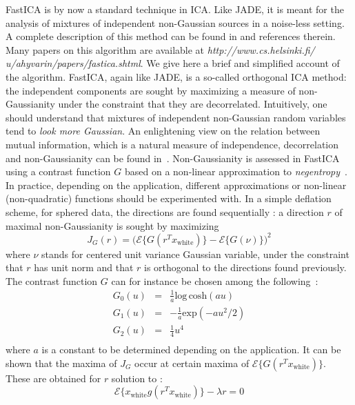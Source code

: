 FastICA is by now a standard technique in ICA. Like JADE, it is meant for the analysis of mixtures of independent non-Gaussian sources in 
a noise-less setting. A complete description of this method can be found in \cite{ica:icabook} and references therein. Many papers on this 
algorithm are available at \emph{http://www.cs.helsinki.fi/ u/ahyvarin/papers/fastica.shtml}. We give here a brief and simplified account 
of the algorithm. FastICA, again like JADE, is a so-called orthogonal ICA method: the independent components are sought by maximizing a 
measure of non-Gaussianity under the constraint that they are decorrelated. Intuitively, one should understand that mixtures of independent 
non-Gaussian random variables tend to \emph{ look more Gaussian}. An enlightening view on the relation between mutual information, which is 
a natural measure of independence, decorrelation and non-Gaussianity can be found in~\cite{ica:3easy,ica:geomindep}. Non-Gaussianity is assessed 
in FastICA using a contrast function $G$ based on a non-linear approximation to \emph{negentropy}~\cite{ica:icabook}. In practice, depending 
on the application, different approximations or non-linear (non-quadratic) functions should be experimented with. In a simple deflation scheme, 
for sphered data, the directions are found sequentially : a direction $r$ of maximal non-Gaussianity is sought by maximizing 
\begin{equation}
J_G(r) = \Big( \mathcal{E} \{ G(r^T x_{\textrm{white}}  ) \} - \mathcal{E} \{ G(\nu ) \} \Big)^2 
\end{equation}
where $\nu$ stands for centered unit variance Gaussian variable, under the constraint that $r$ has unit norm and that $r$ is orthogonal 
to the directions found previously. The contrast function $G$ can for instance be chosen among the following~\cite{ica:icabook}:
\begin{eqnarray}
G_0 (u)  & = &  \frac{1}{a} \textrm{log}\,\textrm{cosh} (a u ) \nonumber    \\
G_1 (u)  & = &  -\frac{1}{a} \textrm{exp}(- a u^2 / 2 )   \nonumber	   \\
G_2 (u)  & = &  \frac{1}{4} u^4 \nonumber    \\
\end{eqnarray}
where $a$ is a constant to be determined depending on the application. It can be shown that the maxima of $J_G$ occur at certain maxima 
of $\mathcal{E} \{ G(r^T x_{\textrm{white}} ) \} $. These are obtained for $r$ solution to :
\begin{equation}
\mathcal{E} \{ x_{\textrm{white}} g(r^T x_{\textrm{white}}  ) \} - \lambda r = 0 
\end{equation}
